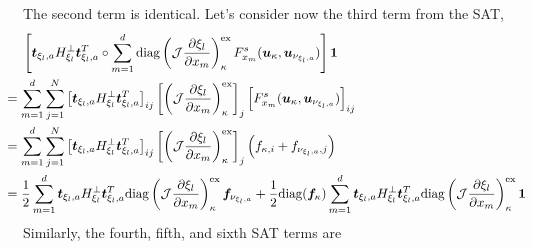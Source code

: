 \documentclass[12pt,a4paper]{article}
\newcommand{\pder}[2][]{\dfrac{\partial #1}{\partial #2}} %
\newcommand{\fn}[1]{\mathcal{#1}} %
\begin{document}
The second term is identical. Let's consider now the third term from the SAT,
\begin{align*}
\left[ \bm{t}_{\xi_l, a} H^{\bot}_{\xi_l} \bm{t}_{\xi_l, a}^T \circ \sum_{m=1}^d \text{diag} \left( \fn{J} \pder[\xi_l]{x_m} \right)_{\kappa}^\text{ex} F^s_{x_m} (\bm{u}_\kappa, \bm{u}_{\nu_{\xi_l,a}}) \right] \bm{1} &\\
& \hspace{-9cm} =   \sum_{m=1}^d  \sum_{j=1}^N \left[ \bm{t}_{\xi_l, a} H^{\bot}_{\xi_l} \bm{t}_{\xi_l, a}^T \right]_{ij} \left[  \left( \fn{J} \pder[\xi_l]{x_m} \right)_{\kappa}^\text{ex} \right]_j \left[ F^s_{x_m} (\bm{u}_\kappa, \bm{u}_{\nu_{\xi_l,a}}) \right]_{ij} \\
& \hspace{-9cm} =  \sum_{m=1}^d  \sum_{j=1}^N \left[ \bm{t}_{\xi_l, a} H^{\bot}_{\xi_l} \bm{t}_{\xi_l, a}^T \right]_{ij} \left[  \left( \fn{J} \pder[\xi_l]{x_m} \right)_{\kappa}^\text{ex} \right]_j   \left( f_{\kappa,i} + f_{\nu_{\xi_l,a},j} \right) \\
& \hspace{-9cm} =  \frac{1}{2} \sum_{m=1}^d  \bm{t}_{\xi_l, a} H^{\bot}_{\xi_l} \bm{t}_{\xi_l, a}^T \text{diag} \left( \fn{J} \pder[\xi_l]{x_m} \right)_{\kappa}^\text{ex} \bm{f}_{\nu_{\xi_l,a}} + \frac{1}{2} \text{diag} (\bm{f}_\kappa) \sum_{m=1}^d  \bm{t}_{\xi_l, a} H^{\bot}_{\xi_l} \bm{t}_{\xi_l, a}^T \text{diag} \left( \fn{J} \pder[\xi_l]{x_m} \right)_{\kappa}^\text{ex} \bm{1} \\
\end{align*}
Similarly, the fourth, fifth, and sixth SAT terms are
\end{document}
